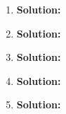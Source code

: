 \documentclass{article}
\begin{document}
\begin{enumerate}
    \item \textbf{Solution:}

    \item \textbf{Solution:}

    \item \textbf{Solution:}

    \item \textbf{Solution:}

    \item \textbf{Solution:}
\end{enumerate}
\end{document}
